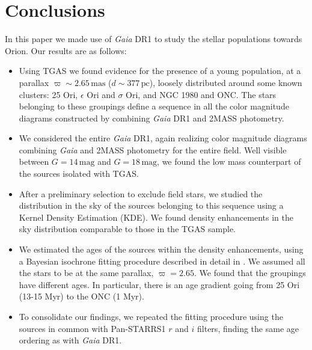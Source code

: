 \documentclass[twocolumn]{aa}
\begin{document}
\section{Conclusions}
In this paper we made use of  \textit{Gaia} DR1 \citep{Brown2016, Prusti2016, vanLeeuwen2017} to study the stellar populations towards Orion. Our results are as follows:

\begin{itemize}
\item Using TGAS \citep{Michalik2015, Lindegren2016} we found evidence for the presence of a young population, at a parallax $\varpi \sim 2.65 \, \mathrm{mas}$  ($d \sim 377 \, \mathrm{pc}$), loosely distributed around some known clusters: 25 Ori, $\epsilon$ Ori and $\sigma$ Ori, and  NGC 1980 and ONC. The stars belonging to these groupings define a sequence in all the color magnitude diagrams constructed by combining \textit{Gaia} DR1 and 2MASS photometry.
\item We considered the entire \textit{Gaia} DR1, again realizing color magnitude diagrams combining \textit{Gaia} and 2MASS photometry for the entire field. Well visible between $G = 14 \, \mathrm{mag}$  and $G = 18 \, \mathrm{mag}$, we found the low mass counterpart of the sources isolated with TGAS. 
\item After a preliminary selection to exclude field stars, we studied the distribution in the sky of the sources belonging to this sequence using a Kernel Density Estimation (KDE). We found  density enhancements in the sky distribution comparable to those in the TGAS sample.
\item We estimated the ages of the sources within the density enhancements, using  a Bayesian isochrone fitting procedure described in detail in \cite{Jorgensen2005}. We  assumed all the stars to be at the same parallax, $\varpi = 2.65$. We found that the groupings have different ages. In particular, there is an age gradient going from 25 Ori (13-15 Myr) to the ONC (1 Myr).
 \item To consolidate our findings, we repeated the fitting procedure using the sources in common with Pan-STARRS1 \citep{Chambers2016, Magnier2016} $r$ and $i$ filters, finding the same age ordering as with \textit{Gaia} DR1. 
 

\end{itemize}
\end{document}
